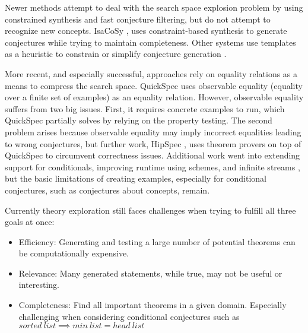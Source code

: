 Newer methods attempt to deal with the search space explosion problem by using constrained synthesis and fast conjecture filtering, but do not attempt to recognize new concepts.
IsaCoSy , uses constraint-based synthesis to generate conjectures while trying to maintain completeness.
Other systems use templates as a heuristic to constrain or simplify conjecture generation . 

More recent, and especially successful, approaches rely on equality relations as a means to compress the search space.
QuickSpec  uses observable equality (equality over a finite set of examples) as an equality relation.
However, observable equality suffers from two big issues.
First, it requires concrete examples to run, which QuickSpec partially solves by relying on the property testing. 
The second problem arises because observable equality may imply incorrect equalities leading to wrong conjectures, but further work, HipSpec \cite{hipster}, uses theorem provers on top of QuickSpec to circumvent correctness issues.
Additional work went into extending support for conditionals, improving runtime using schemes, and infinite streams , but the basic limitations of creating examples, especially for conditional conjectures, such as conjectures about concepts, remain.

Currently theory exploration still faces challenges when trying to fulfill all three goals at once:
\begin{itemize}
    \item Efficiency: Generating and testing a large number of potential theorems can be computationally expensive.
    \item Relevance: Many generated statements, while true, may not be useful or interesting.
    \item Completeness: Find all important theorems in a given domain. Especially challenging when considering conditional conjectures such as $sorted~list \implies min~list = head~list$
\end{itemize}

